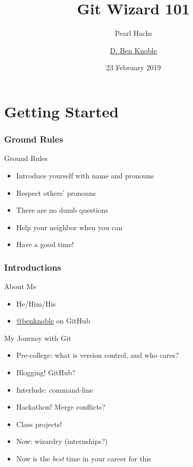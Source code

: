 \documentclass{beamer}
\title{Git Wizard 101}
\subtitle{Pearl Hacks}
\author{\href{https://benknoble.github.io}{D. Ben Knoble}}
\institute{UNC Chapel Hill}
\date{23 February 2019}
\theoremstyle{example}
\begin{document}

\frame[label=title]{\titlepage}

\part{Getting Started}
\frame{\partpage}
\frame{\tableofcontents[part=1]}

\section{Ground Rules}
\begin{frame}{Ground Rules}
    \begin{itemize}
        \item Introduce yourself with name and pronouns
        \item Respect others' pronouns
        \item There are no dumb questions
        \item Help your neighbor when you can
        \item Have a good time!
    \end{itemize}
\end{frame}

\section{Introductions}
\begin{frame}{About Me}
    \begin{itemize}
        \item He/Him/His
        \item \href{https://github.com/benknoble}{@benknoble} on GitHub
    \end{itemize}
\end{frame}

\begin{frame}{My Journey with Git}
    \begin{itemize}[<+->]
        \item Pre-college: what is version control, and who cares?
        \item Blogging! GitHub?
        \item Interlude: command-line
        \item Hackathon! Merge conflicts?
        \item Class projects!
        \item Now: wizardry (internships?)
        \item Now is the \emph{best} time in your career for this
    \end{itemize}
\end{frame}
\end{document}
